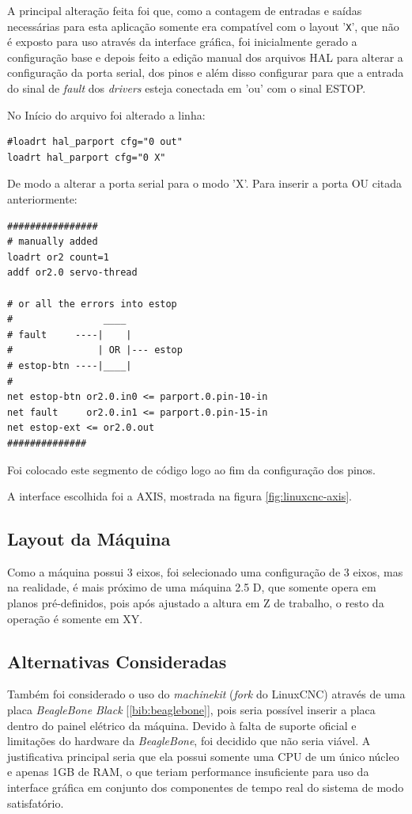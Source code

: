 \documentclass[
	article,			%
	11pt,				%
	oneside,			%
	a4paper,			%
	section=TITLE,		%
	english,			%
	brazil,				%
	sumario=tradicional
	]{abntex2}
\newcommand{\LCNC}{LinuxCNC}
\begin{document}
A principal alteração feita foi que, como a contagem de entradas e saídas necessárias para esta aplicação somente era compatível com o layout '\texttt{X}', que não é exposto para uso através da interface gráfica, foi inicialmente gerado a configuração base e depois feito a edição manual dos arquivos HAL para alterar a configuração da porta serial, dos pinos e além disso configurar para que a entrada do sinal de \textit{fault} dos \textit{drivers} esteja conectada em 'ou' com o sinal ESTOP.

No Início do arquivo foi alterado a linha:
\begin{verbatim}
#loadrt hal_parport cfg="0 out"
loadrt hal_parport cfg="0 X"
\end{verbatim}

De modo a alterar a porta serial para o modo 'X'. Para inserir a porta OU citada anteriormente:

\label{code:pins}
\begin{verbatim}
################
# manually added
loadrt or2 count=1
addf or2.0 servo-thread

# or all the errors into estop
#                ____
# fault     ----|    |
#               | OR |--- estop
# estop-btn ----|____|
#
net estop-btn or2.0.in0 <= parport.0.pin-10-in
net fault     or2.0.in1 <= parport.0.pin-15-in
net estop-ext <= or2.0.out
##############
\end{verbatim}

Foi colocado este segmento de código logo ao fim da configuração dos pinos.

A interface escolhida foi a AXIS, mostrada na figura \ref{fig:linuxcnc-axis}.

\subsection{Layout da Máquina}
Como a máquina possui 3 eixos, foi selecionado uma configuração de 3 eixos, mas na realidade, é mais próximo de uma máquina 2.5 D, que somente opera em planos pré-definidos, pois após ajustado a altura em Z de trabalho, o resto da operação é somente em XY.

\subsection{Alternativas Consideradas}

Também foi considerado o uso do \textit{machinekit} (\textit{fork} do \LCNC) através de uma placa \textit{BeagleBone Black} [\ref{bib:beaglebone}], pois seria possível inserir a placa dentro do painel elétrico da máquina. Devido à falta de suporte oficial e limitações do hardware da \textit{BeagleBone}, foi decidido que não seria viável. A justificativa principal seria que ela possui somente uma CPU de um único núcleo e apenas 1GB de RAM, o que teriam performance insuficiente para uso da interface gráfica em conjunto dos componentes de tempo real do sistema de modo satisfatório.
\end{document}
